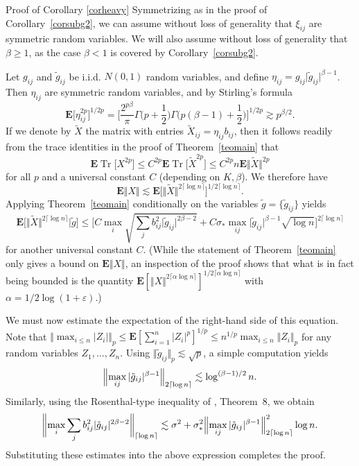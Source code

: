 \documentclass[aop,MSNbibl,dvips]{arximspdf}
\newcommand{\rrvert}{\vert}
\newcommand{\rrVert}{\Vert}
\newcommand{\llvert}{\vert}
\newcommand{\llVert}{\Vert}
\renewcommand{\mid}{|}
\newcommand{\EE}{\mathbf{E}}
\newcommand{\Tr}{\operatorname{Tr}}
\begin{document}
\begin{pf*}{Proof of Corollary \ref{corheavy}}
Symmetrizing as in the proof of Corollary~\ref{corsubg2}, we can assume
without loss of generality that $\xi_{ij}$ are symmetric random variables.
We will also assume without loss of generality that $\beta\ge1$, as the
case $\beta<1$ is covered by Corollary~\ref{corsubg2}.

Let $g_{ij}$ and $\tilde g_{ij}$ be i.i.d. $N(0,1)$ random variables,
and define $\eta_{ij} = g_{ij}\llvert \tilde g_{ij}\rrvert ^{\beta-1}$.
Then $\eta_{ij}$ are symmetric random variables, and
by Stirling's formula
%
\[
\EE\bigl[\eta_{ij}^{2p}\bigr]^{1/2p} = \biggl[
\frac{2^{p\beta}}{\pi} \Gamma\biggl(p+\frac{1}{2}\biggr)\Gamma\biggl
(p(\beta-1)+
\frac{1}{2}\biggr) \biggr]^{1/2p} \gtrsim p^{\beta/2}.
%
\]
%
If we denote by $\tilde X$ the matrix with
entries $\tilde X_{ij}=\eta_{ij}b_{ij}$, then it follows readily
from the trace identities in the proof of Theorem~\ref{teomain}
that
%
\[
\EE\Tr\bigl[X^{2p}\bigr] \le C^{2p} \EE\Tr\bigl[\tilde
X^{2p}\bigr] \le C^{2p}n\EE\llVert\tilde X\rrVert
^{2p} %
\]
%
for all $p$ and a universal constant $C$ (depending on $K,\beta$).
We therefore have
%
\[
\EE\llVert X\rrVert\lesssim\EE\bigl[\llVert\tilde X\rrVert^{2\lceil
\log n\rceil}
\bigr]^{
1/2\lceil\log n\rceil}. %
\]
%
Applying Theorem~\ref{teomain} conditionally
on the variables $\tilde g=\{\tilde g_{ij}\}$ yields
%
\[
\EE\bigl[\llVert\tilde X\rrVert^{2\lceil\log n\rceil}\mid\tilde
g\bigr] \le\biggl[
C\max_i\sqrt{\sum_jb_{ij}^2
\llvert\tilde g_{ij}\rrvert^{2\beta-2}} + C\sigma_*\max
_{ij}\llvert\tilde g_{ij}\rrvert^{\beta-1}
\sqrt{\log n} \biggr]^{2\lceil\log n\rceil} %
\]
%
for another universal constant $C$. (While the statement of
Theorem~\ref{teomain} only gives a bound on $\EE\llVert X\rrVert $, an
inspection of the\vspace*{1pt}
proof shows that what is in fact being bounded is the quantity
$\EE[\llVert X\rrVert ^{2\lceil\alpha\log n\rceil}]^{1/2\lceil\alpha
\log
n\rceil}$ with $\alpha=1/2\log(1+\varepsilon)$.)

We must now estimate the expectation of the right-hand side of this
equation. Note that $\Vert\max_{i\le n}\vert Z_i\vert\Vert_p \le
\EE[\sum_{i=1}^n\vert Z_i\vert^p]^{1/p} \le n^{1/p}\max_{i\le n}\Vert
Z_i\Vert_p$
for any random variables $Z_1,\ldots,Z_n$.
Using $\llVert \tilde g_{ij}\rrVert _{p}\lesssim\sqrt{p}$, a simple
computation
yields
%
\[
\Bigl\llVert\max_{ij}\llvert\tilde g_{ij}\rrvert
^{\beta-1} \Bigr\rrVert_{2\lceil\log n\rceil} \lesssim\log^{(\beta-1)/2}n.
%
\]
%
Similarly, using the Rosenthal-type inequality of \cite{BBLM05},
Theorem~8, we obtain
%
\[
\biggl\llVert\max_i\sum_jb_{ij}^2
\llvert\tilde g_{ij}\rrvert^{2\beta-2} \biggr\rrVert
_{\lceil\log n\rceil} \lesssim\sigma^2 + \sigma_*^2 \Bigl
\llVert\max_{ij}\llvert\tilde g_{ij}\rrvert
^{\beta-1}\Bigr\rrVert_{2\lceil
\log n\rceil}^2\log n. %
\]
%
Substituting these estimates into the above expression completes the
proof.
\end{pf*}
\end{document}
